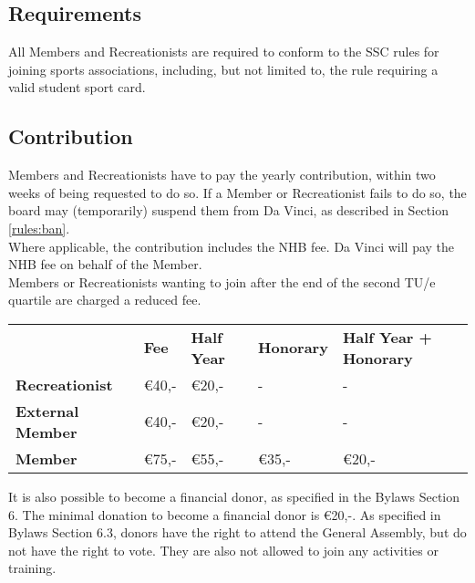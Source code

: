 \documentclass[a4paper]{article}
\newcommand{\Asta}{Bylaws} %
\begin{document}
\subsection{Requirements}
All { Members} and { Recreationists} are required to conform to the { SSC} rules for joining sports associations, including, but not limited to, the rule requiring a valid student sport card.

\subsection{Contribution}
{ Members} and { Recreationists} have to pay the yearly contribution, within two weeks of being requested to do so. If a { Member} or { Recreationist} fails to do so, the board may (temporarily) suspend them from Da Vinci, as described in Section \ref{rules:ban}. \\

Where applicable, the contribution includes the { NHB} fee. Da Vinci will pay the { NHB} fee on behalf of the { Member}. \\

{ Members} or { Recreationists} wanting to join after the end of the second { TU/e} quartile are charged a reduced fee. \\


\bigskip
\begin{tabular}{lllll}
                         & \textbf{Fee} & \textbf{Half Year} & \textbf{Honorary} & \textbf{Half Year + Honorary} \\
\textbf{Recreationist}   & €40,-        & €20,-              & -                 & -                             \\
\textbf{External Member} & €40,-        & €20,-              & -                 & -                             \\
\textbf{Member}          & €75,-        & €55,-              & €35,-             & €20,-                        
\end{tabular}

\bigskip

It is also possible to become a financial donor, as specified in the { \Asta} Section 6. The minimal donation to become a financial donor is €20,-. As specified in { \Asta} Section 6.3, donors have the right to attend the { General Assembly}, but do not have the right to vote. They are also not allowed to join any activities or training.
\end{document}
